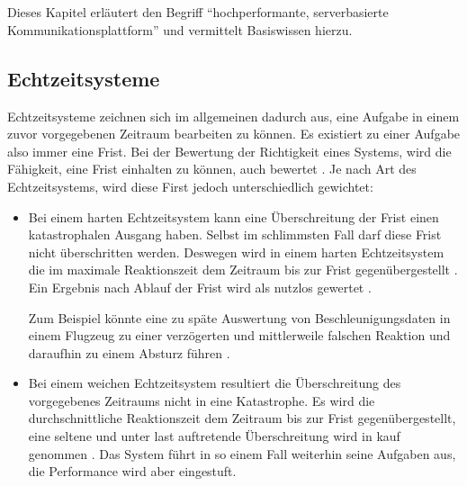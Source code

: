 
\chapter{}
\label{com_plattform}

Dieses Kapitel erläutert den Begriff \enquote{hochperformante, serverbasierte Kommunikationsplattform} und vermittelt Basiswissen hierzu.

\section{Echtzeitsysteme}
\label{real_time_systems}
Echtzeitsysteme zeichnen sich im allgemeinen dadurch aus, eine Aufgabe in einem zuvor vorgegebenen Zeitraum bearbeiten zu können.
Es existiert zu einer Aufgabe also immer eine Frist.
Bei der Bewertung der Richtigkeit eines Systems, wird die Fähigkeit, eine Frist einhalten zu können, auch bewertet \cite[2]{perf:buttazzo2006soft}.
Je nach Art des Echtzeitsystems, wird diese First jedoch unterschiedlich gewichtet:

\begin{itemize}
	\item Bei einem harten Echtzeitsystem kann eine Überschreitung der Frist einen katastrophalen Ausgang haben.
	Selbst im schlimmsten Fall darf diese Frist nicht überschritten werden.
	Deswegen wird in einem harten Echtzeitsystem die im maximale Reaktionszeit dem Zeitraum bis zur Frist gegenübergestellt \cite[75]{douglass2003real}.
	Ein Ergebnis nach Ablauf der Frist wird als nutzlos gewertet \cite[2]{perf:wang2017real}.
	
	Zum Beispiel könnte eine zu späte Auswertung von Beschleunigungsdaten in einem Flugzeug zu einer verzögerten und mittlerweile falschen Reaktion und daraufhin zu einem Absturz führen \cite[5]{perf:laplante2004real}.
	
	\item Bei einem weichen Echtzeitsystem resultiert die Überschreitung des vorgegebenes Zeitraums nicht in eine Katastrophe.
	Es wird die durchschnittliche Reaktionszeit dem Zeitraum bis zur Frist gegenübergestellt, eine seltene und unter last auftretende Überschreitung wird in kauf genommen \cite[76]{douglass2003real}.
	Das System führt in so einem Fall weiterhin seine Aufgaben aus, die Performance wird aber  eingestuft.
\end{itemize}

